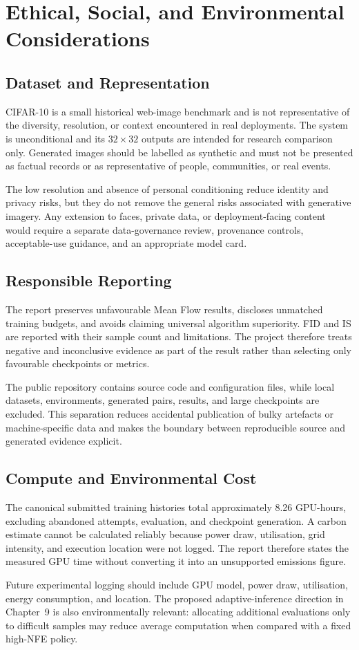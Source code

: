 \chapter{Ethical, Social, and Environmental Considerations}

\section{Dataset and Representation}

CIFAR-10 is a small historical web-image benchmark and is not representative of
the diversity, resolution, or context encountered in real deployments. The
system is unconditional and its $32\!\times\!32$ outputs are intended for
research comparison only. Generated images should be labelled as synthetic and
must not be presented as factual records or as representative of people,
communities, or real events.

The low resolution and absence of personal conditioning reduce identity and
privacy risks, but they do not remove the general risks associated with
generative imagery. Any extension to faces, private data, or deployment-facing
content would require a separate data-governance review, provenance controls,
acceptable-use guidance, and an appropriate model card.

\section{Responsible Reporting}

The report preserves unfavourable Mean Flow results, discloses unmatched
training budgets, and avoids claiming universal algorithm superiority. FID and
IS are reported with their sample count and limitations. The project therefore
treats negative and inconclusive evidence as part of the result rather than
selecting only favourable checkpoints or metrics.

The public repository contains source code and configuration files, while local
datasets, environments, generated pairs, results, and large checkpoints are
excluded. This separation reduces accidental publication of bulky artefacts or
machine-specific data and makes the boundary between reproducible source and
generated evidence explicit.

\section{Compute and Environmental Cost}

The canonical submitted training histories total approximately 8.26 GPU-hours,
excluding abandoned attempts, evaluation, and checkpoint generation. A carbon
estimate cannot be calculated reliably because power draw, utilisation, grid
intensity, and execution location were not logged. The report therefore states
the measured GPU time without converting it into an unsupported emissions
figure.

Future experimental logging should include GPU model, power draw, utilisation,
energy consumption, and location. The proposed adaptive-inference direction in
Chapter~9 is also environmentally relevant: allocating additional evaluations
only to difficult samples may reduce average computation when compared with a
fixed high-NFE policy.
